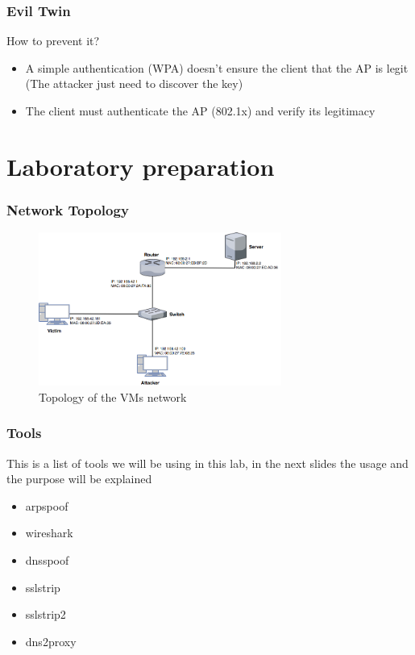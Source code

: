 \documentclass{beamer}
\begin{document}
\begin{frame}
  \frametitle{Evil Twin}
  \begin{block}{How to prevent it?}
  \pause
  \begin{itemize}
    \item A simple authentication (WPA) doesn't ensure the client that the AP is legit (The attacker just need to discover the key)
    \item The client must authenticate the AP (802.1x) and verify its legitimacy
  \end{itemize}
\end{block}
\end{frame}

\section{Laboratory preparation}
\begin{frame}
\frametitle{Network Topology}
\begin{figure}
  \includegraphics[height=190px]{figures/net_topo}
  \caption*{Topology of the VMs network}
\end{figure}
\end{frame}


\begin{frame}
\frametitle{Tools}
This is a list of tools we will be using in this lab, in the next slides the usage and the purpose will be explained
\vfill
\begin{block}{}
  \begin{itemize}
    \item arpspoof
    \item wireshark
    \item dnsspoof
    \item sslstrip
    \item sslstrip2
    \item dns2proxy
  \end{itemize}
\end{block}

\end{frame}
\end{document}
